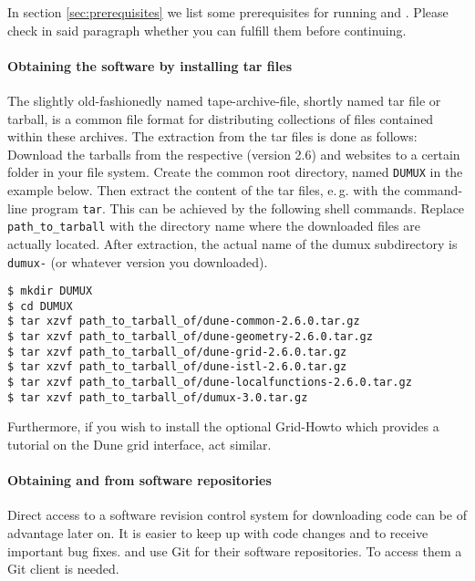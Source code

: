 In section \ref{sec:prerequisites} we list some prerequisites for running \Dune and \Dumux.
Please check in said paragraph whether you can fulfill them before continuing.

\paragraph{Obtaining the software by installing tar files}
The slightly old-fashionedly named tape-archive-file, shortly named tar file or
tarball, is a common file format for distributing collections of files contained
within these archives.
The extraction from the tar files is done as follows:
Download the tarballs from the respective \Dune (version 2.6) and \Dumux websites
to a certain folder in your file system.
Create the common root directory, named \texttt{DUMUX} in the example below.
Then extract the content of the tar files, e.\,g. with the command-line program
\texttt{tar}.
This can be achieved by the following shell commands. Replace \texttt{path\_to\_tarball}
with the directory name where the downloaded files are actually located.
After extraction, the actual name of the dumux subdirectory is \texttt{dumux-\DumuxVersion}
(or whatever version you downloaded).

\begin{lstlisting}[style=Bash]
$ mkdir DUMUX
$ cd DUMUX
$ tar xzvf path_to_tarball_of/dune-common-2.6.0.tar.gz
$ tar xzvf path_to_tarball_of/dune-geometry-2.6.0.tar.gz
$ tar xzvf path_to_tarball_of/dune-grid-2.6.0.tar.gz
$ tar xzvf path_to_tarball_of/dune-istl-2.6.0.tar.gz
$ tar xzvf path_to_tarball_of/dune-localfunctions-2.6.0.tar.gz
$ tar xzvf path_to_tarball_of/dumux-3.0.tar.gz
\end{lstlisting}

Furthermore, if you wish to install the optional \Dune Grid-Howto which provides a tutorial
on the Dune grid interface, act similar.

\paragraph{Obtaining \Dune and \Dumux from software repositories}
Direct access to a software revision control system for downloading code can be of advantage later on.
It is easier to keep up with code changes and to receive important bug fixes.
\Dune and \Dumux use Git for their software repositories. To access them a Git client is needed.

